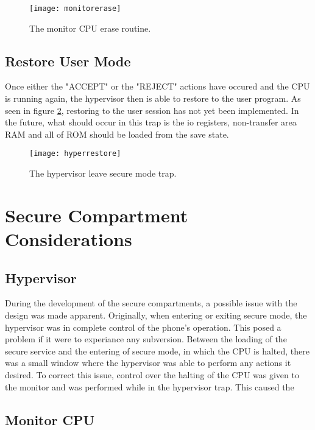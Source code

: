 \begin{figure}
  \centering
  \texttt{[image: monitorerase]}
  \caption{The monitor CPU erase routine.}
  \label{fig:monitorerase}
\end{figure}


\subsection{Restore User Mode}

\label{Ch6 Sec3 Sub5}

Once either the "ACCEPT" or the "REJECT" actions have occured and the CPU is running again, the hypervisor then is able to restore to the user program. As seen in figure \ref{fig:hyperrestore}, restoring to the user session has not yet been implemented. In the future, what should occur in this trap is the io registers, non-transfer area RAM and all of ROM should be loaded from the save state.

\begin{figure}
  \centering
  \texttt{[image: hyperrestore]}
  \caption{The hypervisor leave secure mode trap.}
  \label{fig:hyperrestore}
\end{figure}


\section{Secure Compartment Considerations}

\label{Ch6 Sec3}


\subsection{Hypervisor}

\label{Ch6 Sec3 Sub1}

During the development of the secure compartments, a possible issue with the design was made apparent. Originally, when entering or exiting secure mode, the hypervisor was in complete control of the phone's operation. This posed a problem if it were to experiance any subversion. Between the loading of the secure service and the entering of secure mode, in which the CPU is halted, there was a small window where the hypervisor was able to perform any actions it desired. To correct this issue, control over the halting of the CPU was given to the monitor and was performed while in the hypervisor trap. This caused the   


\subsection{Monitor CPU}

\label{Ch6 Sec3 Sub2}
